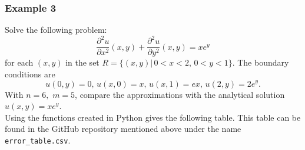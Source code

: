 \documentclass[a4paper]{article}
\begin{document}
\subsubsection{Example 3}
Solve the following problem:
\begin{equation}
\frac{\partial^2 u}{\partial x^2}(x,y)+\frac{\partial^2 u}{\partial y^2}(x,y)=x e^{y}
\end{equation}
for each $(x,y)$ in the set $R=\{ (x,y)|\, 0<x<2,\, 0<y<1 \}$. The boundary conditions are
\begin{equation*}
u(0,y)=0,\,u(x,0)=x,\, u(x,1)=ex,\, u(2,y)=2e^y.
\end{equation*}
With $n=6,\,\,m=5$, compare the approximations with the analytical solution $u(x,y)=x e^y$.\\
Using the functions created in Python gives the following table. This table can be found in the GitHub repository mentioned above under the name \texttt{error\_table.csv}.\\
\end{document}
